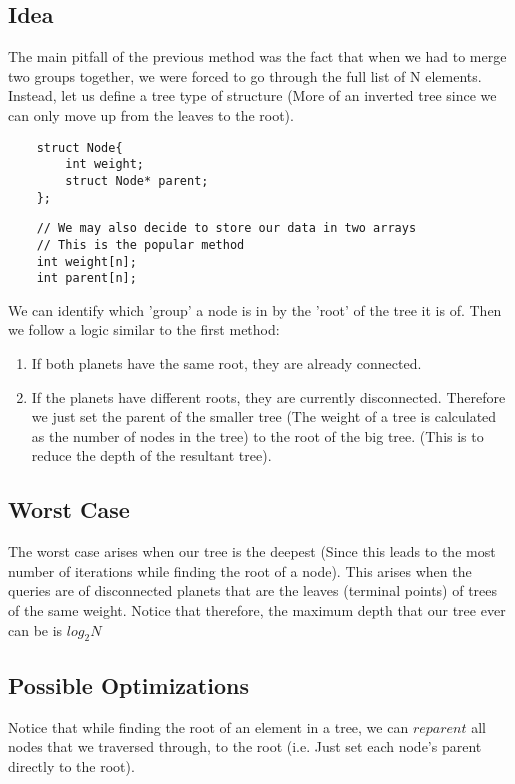 \documentclass[a4paper]{article}
\begin{document}
\subsection{Idea}
The main pitfall of the previous method was the fact that when we had to merge two groups together, we were forced to go through the full list of N elements. Instead, let us define a tree type of structure (More of an inverted tree since we can only move up from the leaves to the root). 
\begin{multicols}{2}
\begin{verbatim}
    struct Node{
        int weight;
        struct Node* parent;
    };
\end{verbatim}
\begin{verbatim}
    // We may also decide to store our data in two arrays
    // This is the popular method
    int weight[n];
    int parent[n];
\end{verbatim}
\end{multicols}
We can identify which 'group' a node is in by the 'root' of the tree it is of. Then we follow a logic similar to the first method:
\begin{enumerate}
    \item If both planets have the same root, they are already connected.
    \item If the planets have different roots, they are currently disconnected. Therefore we just set the parent of the smaller tree (The weight of a tree is calculated as the number of nodes in the tree) to the root of the big tree. (This is to reduce the depth of the resultant tree).
\end{enumerate}

\subsection{Worst Case}
The worst case arises when our tree is the deepest (Since this leads to the most number of iterations while finding the root of a node). This arises when the queries are of disconnected planets that are the leaves (terminal points) of trees of the same weight. Notice that therefore, the maximum depth that our tree ever can be is $log _{2} N$
\subsection{Possible Optimizations}
Notice that while finding the root of an element in a tree, we can  $reparent$ all nodes that we traversed through, to the root (i.e. Just set each node's parent directly to the root).
\end{document}
